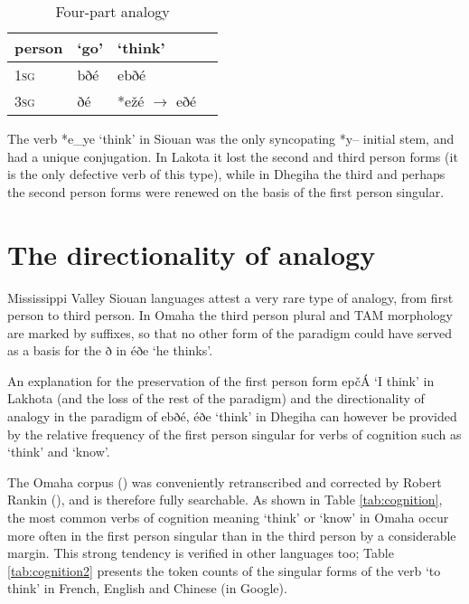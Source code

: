 \documentclass[oneside,a4paper,11pt]{article}
\newcommand{\ipa}[1]{{\phon#1}} %
\begin{document}
 \begin{table}[h]
\caption{Four-part analogy}  \label{tab:four} \centering
\begin{tabular}{l|l|ll}
\toprule
person & `go' & `think' \\
 \midrule
\textsc{1sg} &\ipa{bðé} & \ipa{ebðé} \\
\textsc{3sg}&\ipa{ðé} & *\ipa{ežé} $\rightarrow$ \ipa{eðé} \\
\bottomrule			
\end{tabular}
\end{table} 


The verb *\ipa{e\_ye} `think' in Siouan was the only syncopating *\ipa{y--} initial stem, and had a unique conjugation. In Lakota it lost the second and third person forms (it is the only defective verb of this type), while in Dhegiha the third and perhaps the second person forms were renewed on the basis of the first person singular.


\section{The directionality of analogy} \label{sec:directionality}

Mississippi Valley Siouan languages attest  a very rare type of analogy, from first person to third person. In Omaha the third person plural  and TAM morphology are marked by suffixes, so that no other form of the paradigm could have served as a basis for the \ipa{ð} in \ipa{éðe} `he thinks'.

An explanation for the preservation of the first person form \ipa{epčÁ} `I think' in Lakhota (and the loss of the rest of the paradigm) and the directionality of analogy in the paradigm of \ipa{ebðé}, \ipa{éðe} `think' in Dhegiha can however be provided by the relative frequency of the first person singular for verbs of cognition such as   `think' and `know'.

The Omaha corpus (\citealt{dorsey1890cegiha}) was conveniently retranscribed and corrected by Robert Rankin (\citealt{rankin08dhegiha}), and is therefore fully searchable. As shown in Table \ref{tab:cognition}, the most common  verbs of cognition meaning `think' or `know' in Omaha occur more often in the first person singular than in the third person by a considerable margin. This strong tendency is verified in other languages too; Table \ref{tab:cognition2} presents the token counts of the singular forms of the verb `to think' in French, English and Chinese (in Google).
\end{document}
